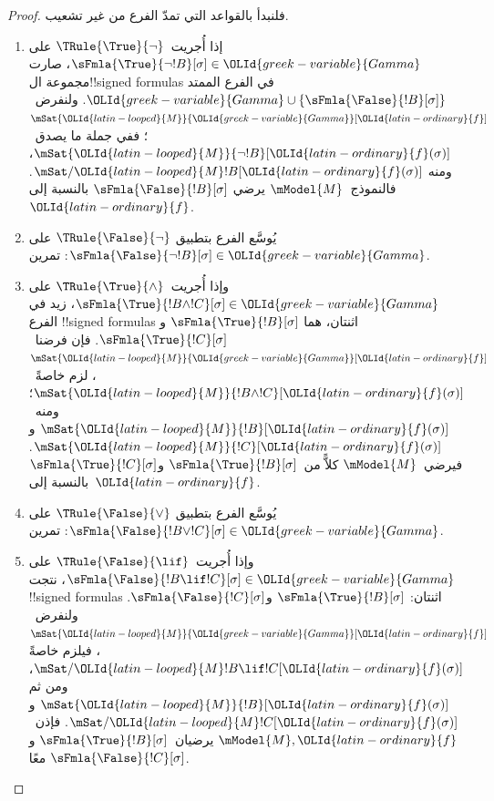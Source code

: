 \documentclass[../../../include/open-logic-section]{subfiles}
\begin{document}
\begin{proof}
فلنبدأ بالقواعد التي تمدّ الفرع من غير تشعيب.
\begin{enumerate}
\item إذا أُجريت~$\TRule{\True}{\lnot}$ على
  $\sFmla{\True}{\lnot !B}[\sigma] \in \OLId{greek-variable}{Gamma}$،
  صارت مجموعة ال!!{signed formula}s في الفرع الممتد
  $\OLId{greek-variable}{Gamma} \cup
  \{\sFmla{\False}{!B}[\sigma]\}$. ولنفرض~$\mSat{\OLId{latin-looped}{M}}{\OLId{greek-variable}{Gamma}}[\OLId{latin-ordinary}{f}]$؛
  ففي جملة ما يصدق~$\mSat{\OLId{latin-looped}{M}}{\lnot !B}[\OLId{latin-ordinary}{f}(\sigma)]$، ومنه
  $\mSat/{\OLId{latin-looped}{M}}{!B}[\OLId{latin-ordinary}{f}(\sigma)]$. فالنموذج~$\mModel{M}$ يرضي
  $\sFmla{\False}{!B}[\sigma]$ بالنسبة إلى~$\OLId{latin-ordinary}{f}$.
\item يُوسَّع الفرع بتطبيق $\TRule{\False}{\lnot}$ على
  $\sFmla{\False}{\lnot !B}[\sigma] \in \OLId{greek-variable}{Gamma}$: تمرين.
\item وإذا أُجريت~$\TRule{\True}{\land}$ على
  $\sFmla{\True}{!B \land !C}[\sigma] \in \OLId{greek-variable}{Gamma}$،
  زيد في الفرع !!{signed formula}s اثنتان، هما
  $\sFmla{\True}{!B}[\sigma]$ و$\sFmla{\True}{!C}[\sigma]$.
  فإن فرضنا~$\mSat{\OLId{latin-looped}{M}}{\OLId{greek-variable}{Gamma}}[\OLId{latin-ordinary}{f}]$، لزم خاصةً~$\mSat{\OLId{latin-looped}{M}}{!B \land
    !C}[\OLId{latin-ordinary}{f}(\sigma)]$؛ ومنه~$\mSat{\OLId{latin-looped}{M}}{!B}[\OLId{latin-ordinary}{f}(\sigma)]$
  و$\mSat{\OLId{latin-looped}{M}}{!C}[\OLId{latin-ordinary}{f}(\sigma)]$. فيرضي~$\mModel{M}$
  كلاًّ من~$\sFmla{\True}{!B}[\sigma]$
  و$\sFmla{\True}{!C}[\sigma]$ بالنسبة إلى~$\OLId{latin-ordinary}{f}$.
\item يُوسَّع الفرع بتطبيق $\TRule{\False}{\lor}$ على
  $\sFmla{\False}{!B \lor !C}[\sigma] \in \OLId{greek-variable}{Gamma}$: تمرين.
\item وإذا أُجريت~$\TRule{\False}{\lif}$ على
  $\sFmla{\False}{!B \lif !C}[\sigma] \in \OLId{greek-variable}{Gamma}$،
  نتجت !!{signed formula}s اثنتان:
  $\sFmla{\True}{!B}[\sigma]$ و$\sFmla{\False}{!C}[\sigma]$.
  ولنفرض~$\mSat{\OLId{latin-looped}{M}}{\OLId{greek-variable}{Gamma}}[\OLId{latin-ordinary}{f}]$، فيلزم خاصةً
  $\mSat/{\OLId{latin-looped}{M}}{!B \lif !C}[\OLId{latin-ordinary}{f}(\sigma)]$، ومن ثم
  $\mSat{\OLId{latin-looped}{M}}{!B}[\OLId{latin-ordinary}{f}(\sigma)]$ و$\mSat/{\OLId{latin-looped}{M}}{!C}[\OLId{latin-ordinary}{f}(\sigma)]$.
  فإذن~$\mModel{M}, \OLId{latin-ordinary}{f}$ يرضيان~$\sFmla{\True}{!B}[\sigma]$
  و$\sFmla{\False}{!C}[\sigma]$ معًا.


\end{enumerate}
\end{proof}
\end{document}
